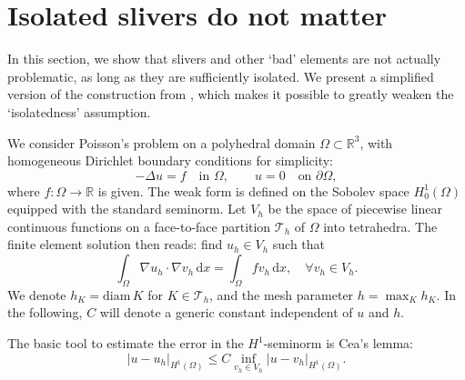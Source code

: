 \documentclass{article}
\begin{document}
\section{Isolated slivers do not matter}
In this section, we show that slivers and other `bad' elements are not actually problematic, as long as they are sufficiently isolated. We present a simplified version of the construction from \cite{kuvcera2016necessary}, which makes it possible to greatly weaken the `isolatedness' assumption.

We consider Poisson's problem on a polyhedral domain $\Omega \subset \mathbb{R}^3$, with homogeneous Dirichlet boundary conditions for simplicity:
\begin{equation}
- \Delta u = f \quad \text{in } \Omega,
\qquad u = 0 \quad \text{on } \partial \Omega,
\end{equation}
where $f : \Omega \to \mathbb{R}$ is given. The weak form is defined on the Sobolev space $H^1_0(\Omega)$ equipped with the standard seminorm. Let $V_h$ be the space of piecewise linear continuous functions on a face-to-face partition $\mathcal{T}_h$ of $\Omega$ into tetrahedra. The finite element solution then reads: find $u_h\in V_h$ such that
\begin{equation}
\int_\Omega \nabla u_h\cdot\nabla v_h\,\mathrm{d}x= \int_\Omega f v_h\,\mathrm{d}x,\quad\forall v_h\in V_h.
\end{equation}
We denote $h_K = \mathrm{diam}\,K$ for $K\in\mathcal{T}_h$, and the mesh parameter $h=\max_K h_K$. In the following, $C$ will denote a generic constant independent of $u$ and $h$.

The basic tool to estimate the error in the $H^1$-seminorm is Cea's lemma:
\begin{equation}
|u-u_h|_{H^1(\Omega)}\leq C\inf_{v_h\in V_h}|u-v_h|_{H^1(\Omega)}.
\end{equation}
\end{document}
